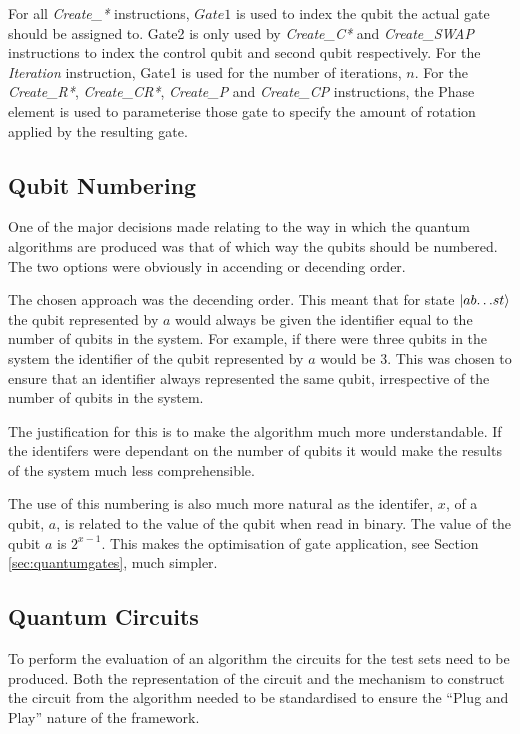 For all \emph{Create\_*} instructions, $Gate1$ is used to index the qubit the actual gate should be assigned to.
Gate2 is only used by \emph{Create\_C*} and \emph{Create\_SWAP} instructions to index the control qubit and second qubit respectively.
For the \emph{Iteration} instruction, Gate1 is used for the number of iterations, $n$.
For the \emph{Create\_R*}, \emph{Create\_CR*}, \emph{Create\_P} and  \emph{Create\_CP} instructions, the Phase element is used to parameterise those gate to specify the amount of rotation applied by the resulting gate.

\subsection{Qubit Numbering}
\label{sec:qubitnum}
One of the major decisions made relating to the way in which the quantum algorithms are produced was that of which way the qubits should be numbered.
The two options were obviously in accending or decending order.

The chosen approach was the decending order.
This meant that for state $\left\vert{ab{\dots}st}\right\rangle$ the qubit represented by $a$ would always be given the identifier equal to the number of qubits in the system.
For example, if there were three qubits in the system the identifier of the qubit represented by $a$ would be $3$.
This was chosen to ensure that an identifier always represented the same qubit, irrespective of the number of qubits in the system.

The justification for this is to make the algorithm much more understandable.
If the identifers were dependant on the number of qubits it would make the results of the system much less comprehensible.

The use of this numbering is also much more natural as the identifer, $x$, of a qubit, $a$, is related to the value of the qubit when read in binary.
The value of the qubit $a$ is $2^{x-1}$.
This makes the optimisation of gate application, see Section \ref{sec:quantumgates}, much simpler.

\subsection{Quantum Circuits}
\label{sec:quantumcircuits}
To perform the evaluation of an algorithm the circuits for the test sets need to be produced.
Both the representation of the circuit and the mechanism to construct the circuit from the algorithm needed to be standardised to ensure the ``Plug and Play'' nature of the framework.

